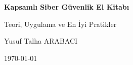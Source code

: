\documentclass[11pt,a4paper,twoside]{book}
\newcommand{\KitapBaslik}{Kapsamlı Siber Güvenlik El Kitabı}
\newcommand{\KitapAltBaslik}{Teori, Uygulama ve En İyi Pratikler}
\newcommand{\YazarAdi}{Yusuf Talha ARABACI}
\begin{document}
\begin{titlepage}
  \centering
  \vspace*{2cm}
  \vspace{1.5cm}
  {\Huge\bfseries \KitapBaslik \par}
  \vspace{0.5cm}
  {\Large \KitapAltBaslik \par}
  \vfill
  {\Large \YazarAdi \par}
  \vspace{1cm}
  {\large \today \par}
\end{titlepage}

\frontmatter
\tableofcontents
\cleardoublepage
\listoffigures
\cleardoublepage
\listoftables

\mainmatter
















\backmatter

\end{document}
